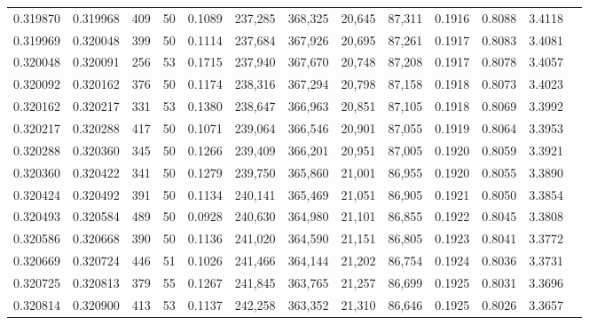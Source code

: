 \begin{tabular}{rrrrrrrrrrrrr}
0.319870 & 0.319968 &   409 &  50 &                                     0.1089 & 237,285 & 368,325 &  20,645 &  87,311 & 0.1916 & 0.8088 & 3.4118 \\
0.319969 & 0.320048 &   399 &  50 &                                     0.1114 & 237,684 & 367,926 &  20,695 &  87,261 & 0.1917 & 0.8083 & 3.4081 \\
0.320048 & 0.320091 &   256 &  53 &                                     0.1715 & 237,940 & 367,670 &  20,748 &  87,208 & 0.1917 & 0.8078 & 3.4057 \\
0.320092 & 0.320162 &   376 &  50 &                                     0.1174 & 238,316 & 367,294 &  20,798 &  87,158 & 0.1918 & 0.8073 & 3.4023 \\
0.320162 & 0.320217 &   331 &  53 &                                     0.1380 & 238,647 & 366,963 &  20,851 &  87,105 & 0.1918 & 0.8069 & 3.3992 \\
0.320217 & 0.320288 &   417 &  50 &                                     0.1071 & 239,064 & 366,546 &  20,901 &  87,055 & 0.1919 & 0.8064 & 3.3953 \\
0.320288 & 0.320360 &   345 &  50 &                                     0.1266 & 239,409 & 366,201 &  20,951 &  87,005 & 0.1920 & 0.8059 & 3.3921 \\
0.320360 & 0.320422 &   341 &  50 &                                     0.1279 & 239,750 & 365,860 &  21,001 &  86,955 & 0.1920 & 0.8055 & 3.3890 \\
0.320424 & 0.320492 &   391 &  50 &                                     0.1134 & 240,141 & 365,469 &  21,051 &  86,905 & 0.1921 & 0.8050 & 3.3854 \\
0.320493 & 0.320584 &   489 &  50 &                                     0.0928 & 240,630 & 364,980 &  21,101 &  86,855 & 0.1922 & 0.8045 & 3.3808 \\
0.320586 & 0.320668 &   390 &  50 &                                     0.1136 & 241,020 & 364,590 &  21,151 &  86,805 & 0.1923 & 0.8041 & 3.3772 \\
0.320669 & 0.320724 &   446 &  51 &                                     0.1026 & 241,466 & 364,144 &  21,202 &  86,754 & 0.1924 & 0.8036 & 3.3731 \\
0.320725 & 0.320813 &   379 &  55 &                                     0.1267 & 241,845 & 363,765 &  21,257 &  86,699 & 0.1925 & 0.8031 & 3.3696 \\
0.320814 & 0.320900 &   413 &  53 &                                     0.1137 & 242,258 & 363,352 &  21,310 &  86,646 & 0.1925 & 0.8026 & 3.3657 \\

\end{tabular}
